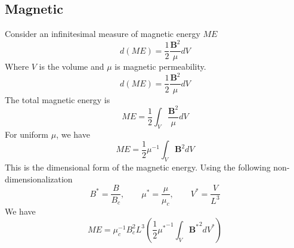 \documentclass[11pt]{article}
\begin{document}
\subsection{Magnetic}
Consider an infinitesimal measure of magnetic energy $ME$
\begin{equation}
	d(ME) = \frac{1}{2} \frac{\mathbf{B}^2}{\mu} dV
\end{equation}
Where $V$ is the volume and $\mu$ is magnetic permeability.
\begin{equation}
	d(ME) = \frac{1}{2} \frac{\mathbf{B}^2}{\mu} dV
\end{equation}
The total magnetic energy is
\begin{equation}
	ME = \frac{1}{2} \int_V \frac{\mathbf{B}^2}{\mu} dV
\end{equation}
For uniform $\mu$, we have
\begin{equation}
	ME = \frac{1}{2} \mu^{-1} \int_V \mathbf{B}^2 dV
\end{equation}
This is the dimensional form of the magnetic energy. Using the following non-dimensionalization
\begin{equation}
	B^* = \frac{B}{B_c},
	\qquad
	\mu^* = \frac{\mu}{\mu_c},
	\qquad
	V^* = \frac{V}{L^3}
\end{equation}
We have
\begin{equation}
	\boxed{
	ME = \mu_c^{-1} B_c^2 L^3 \left( \frac{1}{2} {\mu^*}^{-1} \int_V {\mathbf{B}^*}^2 dV^* \right)
	}
\end{equation}
\end{document}
